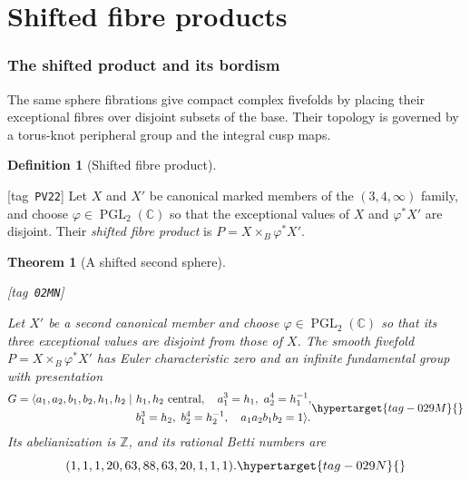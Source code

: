 \documentclass[11pt,a4paper]{article}
\makeatletter
\numberwithin{equation}{section}
\newtheorem{theorem}{Theorem}[section]
\theoremstyle{definition}
\newtheorem{definition}[definition]{Definition}
\newcommand{\StatementRecord}[4]{{\upshape\footnotesize[tag~\texttt{#3}]}\enspace\ignorespaces}
\newcommand{\SeriesRefText}[1]{\ifcsname SRef@#1\endcsname\csname SRef@#1\endcsname\else\textbf{UNRESOLVED}\fi}
\newcommand{\SeriesRef}[1]{\ifmmode\text{\SeriesRefText{#1}}\else\SeriesRefText{#1}\fi}
\makeatother
\begin{document}
\clearpage


\part{Shifted fibre products}\label{pub:V:part-shifted}
\section{The shifted product and its bordism}\label{sec:shifted}

The same sphere fibrations give compact complex fivefolds by placing
their exceptional fibres over disjoint subsets of the base. Their topology
is governed by a torus-knot peripheral group and the integral cusp maps.

\begin{definition}[Shifted fibre product]\hypertarget{tag-PV22}{}\label{def:V:shifted-product}
\StatementRecord{def:V:shifted-product}{proved}{PV22}{}
Let $X$ and $X'$ be canonical marked members of the $(3,4,\infty)$
family, and choose $\varphi\in\operatorname{PGL}_2(\mathbb C)$ so that
the exceptional values of $X$ and $\varphi^*X'$ are disjoint.
Their \emph{shifted fibre product} is $P=X\times_B\varphi^*X'$.
\end{definition}

\begin{theorem}[A shifted second sphere]\hypertarget{tag-02MN}{}\label{maps:src:E.2.3}
\StatementRecord{maps:src:E.2.3}{proved}{02MN}{\SeriesRef{maps:src:E.2.2}, \eqref{maps:eq:E.9}}


Let $X'$ be a second canonical member and choose $\varphi\in
\operatorname{PGL}_2(\mathbb C)$ so that its three exceptional
values are disjoint from those of $X$.  The smooth fivefold
$P=X\times_B\varphi^*X'$ has Euler characteristic zero and
an infinite fundamental group with presentation
\begin{equation}
\begin{split}
G=\langle a_1,a_2,b_1,b_2,h_1,h_2\mid\ &
 h_1,h_2\ \text{central},\quad
 a_1^3=h_1,\ a_2^4=h_1^{-1},\\
 &b_1^3=h_2,\ b_2^4=h_2^{-1},\quad
 a_1a_2b_1b_2=1\rangle .
\end{split}
\hypertarget{tag-029M}{}\label{maps:eq:E.16}
\end{equation}
Its abelianization is $\mathbb Z$, and its rational Betti numbers are
\begin{equation}
 (1,1,1,20,63,88,63,20,1,1,1).
 \hypertarget{tag-029N}{}\label{maps:eq:E.17}
\end{equation}


\end{theorem}
\end{document}
